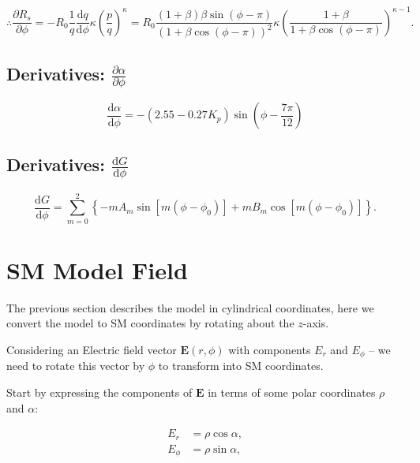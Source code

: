 \documentclass[]{article}
\begin{document}
		\begin{equation}
			\boxed{\therefore \frac{\partial R_s}{\partial \phi} = -R_0\frac{1}{q}\frac{\mathrm{d} q}{\mathrm{d} \phi} \kappa \left( \frac{p}{q} \right)^{\kappa}  = R_0 \frac{(1 + \beta)\beta \sin{(\phi - \pi)}}{(1 + \beta\cos{(\phi - \pi)})^2} \kappa \left(\frac{1+\beta}{1 + \beta\cos{(\phi-\pi)}}\right)^{\kappa-1}.}
		\end{equation}
			
		
		
	\subsection{Derivatives: $\frac{\partial \alpha}{\partial \phi}$}
	
		\begin{equation}
			\boxed{\frac{\mathrm{d} \alpha}{\mathrm{d} \phi} = -(2.55 - 0.27 K_p)\sin{\left(\phi - \frac{7\pi}{12}\right)}}
		\end{equation}
	
	\subsection{Derivatives: $\frac{\mathrm{d} G}{\mathrm{d} \phi}$}
	
		\begin{equation}
			\boxed{\frac{\mathrm{d} G}{\mathrm{d} \phi} = \sum_{m=0}^{2} \left\{-m A_m \sin{[m(\phi - \phi_0)]} + m B_m \cos{[m(\phi-\phi_0)]} \right\}.}
		\end{equation}
		
	
\section{SM Model Field}

	The previous section describes the model in cylindrical coordinates, here we convert the model to SM coordinates by rotating about the $z$-axis.
	
	Considering an Electric field vector $\mathbf{E}(r,\phi)$ with components $E_r$ and $E_\phi$ -- we need to rotate this vector by $\phi$ to transform into SM coordinates.
	
	Start by expressing the components of $\mathbf{E}$ in terms of some polar coordinates $\rho$ and $\alpha$:
	
	\begin{align}
		E_r &= \rho \cos{\alpha}, \label{EqEr}\\
		E_\phi &= \rho \sin{\alpha}, \label{EqEp}
	\end{align}
	
\end{document}

